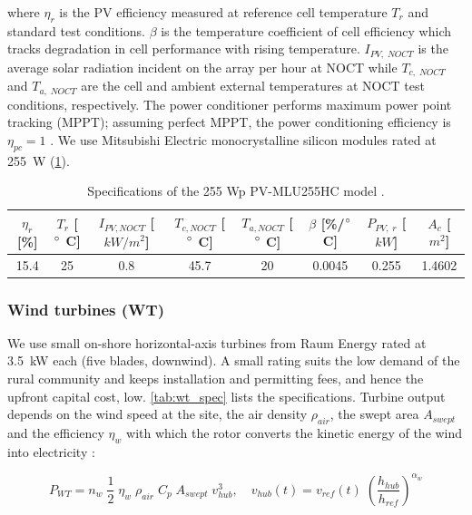 \documentclass[final,3p,times]{elsarticle}
\begin{document}
\noindent where $\eta_r$ is the PV efficiency measured at reference cell temperature $T_r$ and standard test conditions. $\beta$ is the temperature coefficient of cell efficiency which tracks degradation in cell performance with rising temperature. $I_{PV,\;NOCT}$ is the average solar radiation incident on the array per hour at NOCT while $T_{c,\;NOCT}$ and $T_{a,\;NOCT}$ are the cell and ambient external temperatures at NOCT test conditions, respectively. The power conditioner performs maximum power point tracking (MPPT); assuming perfect MPPT, the power conditioning efficiency is $\eta_{pc}= 1$ \cite{kaabeche2011b}. We use Mitsubishi Electric monocrystalline silicon modules rated at 255~W (\cref{tab:pv_cell}).

\begin{table}[htbp]
\centering
\begin{tabular}{@{}cccccccc@{}}
\toprule
$\eta_r$ [\%]  & $T_r$ [$\degree$ C] & $I_{PV,NOCT}$ [$kW/m^2$]  & $T_{c,NOCT}$ [$\degree$ C]  & $T_{a,NOCT}$ [$\degree$ C] & $\beta$ [\%/$\degree$ C] & $P_{PV,\;r}$ [$kW$] & $A_c$ [$m^2$] \\ \midrule
15.4 & 25 & 0.8 & 45.7 & 20 & 0.0045 & 0.255 & 1.4602
\\ \bottomrule
\end{tabular}
\caption{Specifications of the 255 Wp PV-MLU255HC model \cite{mitsubishi}.}
\label{tab:pv_cell} 
\end{table}

\subsubsection{Wind turbines (WT)}

We use small on-shore horizontal-axis turbines from Raum Energy rated at 3.5~kW each (five blades, downwind). A small rating suits the low demand of the rural community and keeps installation and permitting fees, and hence the upfront capital cost, low. \cref{tab:wt_spec} lists the specifications. Turbine output depends on the wind speed at the site, the air density $\rho_{air}$, the swept area $A_{swept}$ and the efficiency $\eta_w$ with which the rotor converts the kinetic energy of the wind into electricity \cite{tazvinga2014}:

\begin{equation}
\label{eq:Pwind}
    P_{WT} = n_w \; \frac{1}{2} \; \eta_w \; \rho_{air} \; C_p \; A_{swept} \; v_{hub}^3, \quad v_{hub}(t) = v_{ref}(t) \; \left(\frac{h_{hub}}{h_{ref}}\right)^{\alpha_w}
\end{equation}
\end{document}
